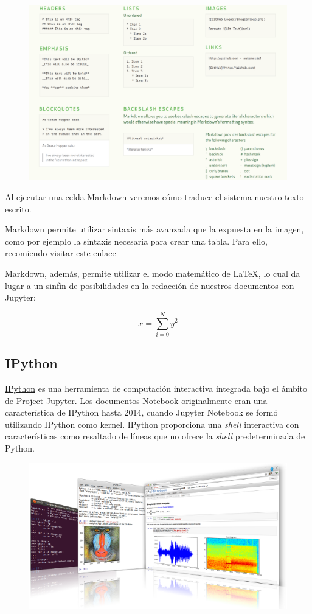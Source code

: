 \documentclass[11pt]{article}
\makeatletter
\def\maxwidth{\ifdim\Gin@nat@width>\linewidth\linewidth
    \else\Gin@nat@width\fi}
\let\Oldincludegraphics\includegraphics
\renewcommand{\includegraphics}[1]{\Oldincludegraphics[width=.8\maxwidth]{#1}}
\makeatother
\begin{document}
    \begin{figure}
\centering
\includegraphics{markdown-cheatsheet.png}
\caption{}
\end{figure}

    Al ejecutar una celda Markdown veremos cómo traduce el sistema nuestro
texto escrito.

Markdown permite utilizar sintaxis más avanzada que la expuesta en la
imagen, como por ejemplo la sintaxis necesaria para crear una tabla.
Para ello, recomiendo visitar
\href{https://github.com/adam-p/markdown-here/wiki/Markdown-Cheatsheet}{este
enlace}

    Markdown, además, permite utilizar el modo matemático de LaTeX, lo cual
da lugar a un sinfín de posibilidades en la redacción de nuestros
documentos con Jupyter:

\[ x = \sum_{i=0}^{N}{y^2} \]

    \subsection{IPython}\label{ipython}

    \href{}{IPython} es una herramienta de computación interactiva integrada
bajo el ámbito de Project Jupyter. Los documentos Notebook originalmente
eran una característica de IPython hasta 2014, cuando Jupyter Notebook
se formó utilizando IPython como kernel. IPython proporciona una
\emph{shell} interactiva con características como resaltado de líneas
que no ofrece la \emph{shell} predeterminada de Python.

    \begin{figure}
\centering
\includegraphics{ipython.png}
\caption{}
\end{figure}
\end{document}
